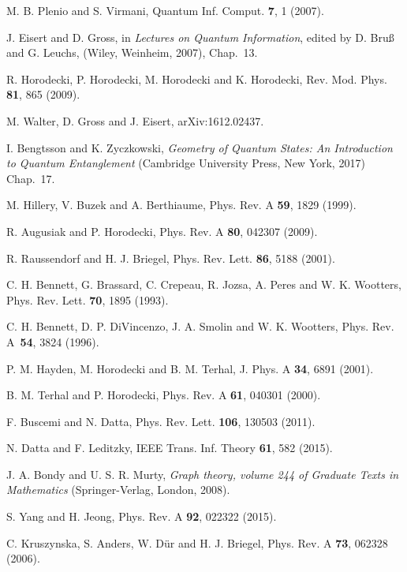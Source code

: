 \documentclass[preprintnumbers,aps,amsmath,amssymb,pra,twocolumn,showpacs,superscriptaddress,floatfix]{revtex4-1}
\theoremstyle{plain}
\theoremstyle{definition}
\theoremstyle{remark}
\begin{document}
\begin{thebibliography}{99}

M. B. Plenio and S. Virmani, Quantum Inf. Comput. \textbf{7}, 1 (2007).

J. Eisert and D. Gross, in \textit{Lectures on Quantum Information}, edited by D. Bru{\ss} and G. Leuchs, (Wiley, Weinheim, 2007), Chap.~13.

R. Horodecki, P. Horodecki, M. Horodecki and K. Horodecki, Rev. Mod. Phys. \textbf{81}, 865 (2009).

M. Walter, D. Gross and J. Eisert, arXiv:1612.02437.

 I. Bengtsson and K. Zyczkowski, \textit{Geometry of Quantum States: An Introduction to Quantum Entanglement} (Cambridge University Press, New York, 2017) Chap.~17.

 M. Hillery, V. Buzek and A. Berthiaume, Phys. Rev. A \textbf{59}, 1829 (1999).

R. Augusiak and P. Horodecki, Phys. Rev. A \textbf{80}, 042307 (2009).

 R. Raussendorf and H. J. Briegel, Phys. Rev. Lett. \textbf {86}, 5188 (2001).

 C. H. Bennett, G. Brassard, C. Crepeau, R. Jozsa, A. Peres and W. K. Wootters, Phys. Rev. Lett. \textbf {70}, 1895 (1993).

 C. H. Bennett, D. P. DiVincenzo, J. A. Smolin and W. K. Wootters, Phys. Rev. A\ \textbf {54}, 3824 (1996).

 P. M. Hayden, M. Horodecki and B. M.  Terhal, J. Phys. A \textbf {34}, 6891 (2001).

 B. M. Terhal and P. Horodecki, Phys. Rev. A \textbf {61}, 040301 (2000).

 F. Buscemi and N. Datta, Phys. Rev. Lett. \textbf{106}, 130503 (2011).

 N. Datta and F. Leditzky, IEEE Trans. Inf. Theory \textbf {61}, 582 (2015).

 J. A. Bondy and U. S. R. Murty,  \textit{Graph theory, volume 244 of Graduate Texts in Mathematics} (Springer-Verlag, London, 2008).

S. Yang and H. Jeong, Phys. Rev. A \textbf{92}, 022322 (2015).

C. Kruszynska, S. Anders, W. D\"ur and H. J. Briegel, Phys. Rev. A \textbf{73}, 062328 (2006).


\end{thebibliography}
\end{document}
